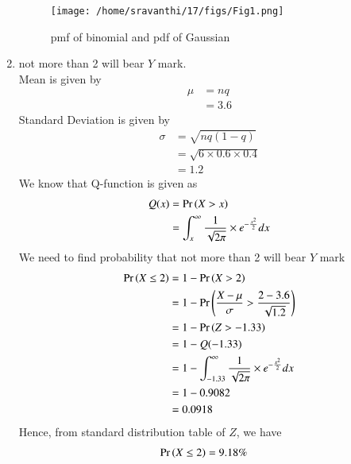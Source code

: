 \documentclass[journal,12pt,twocolumn]{IEEEtran}
\theoremstyle{remark}
\begin{document}
\begin{enumerate}
\begin{figure}
\texttt{[image: /home/sravanthi/17/figs/Fig1.png]}
\caption{pmf of binomial and pdf of Gaussian }
\label{fig:gaussian/9/3/17/}
\end{figure}
\item not more than 2 will bear $Y$ mark.\\
Mean is given by
\begin{align}
	\mu &= nq \\
	&= 3.6
\end{align}
Standard Deviation is given by
\begin{align}
	\sigma &= \sqrt{nq(1 - q)}\\
	&= \sqrt{6 \times 0.6 \times 0.4}\\
	&=  1.2
\end{align}
We know that Q-function is given as\\
\begin{align}
Q(x) &= \Pr\left(X > x\right)\\
&= \int_{x}^{\infty}\frac{1}{\sqrt{2\pi}}\times e^{-\frac{x^2}{2}}dx
\end{align}
We need to find probability that not more than 2 will bear $Y$ mark
\begin{align}
\Pr\left(X \leq 2\right) &= 1 - \Pr\left(X > 2\right)\\
&= 1 - \Pr\left(\frac{X - \mu}{\sigma} > \frac{2 - 3.6}{\sqrt{1.2}}\right) \\
&= 1 - \Pr\left(Z > -1.33\right) \\
&= 1 - Q(-1.33)\\
&= 1 - \int_{-1.33}^{\infty}\frac{1}{\sqrt{2\pi}}\times e^{-\frac{x^2}{2}}dx\\
&= 1- 0.9082\\
&=0.0918
\end{align}
Hence, from standard distribution table of $Z$, we have
\begin{align}
	\Pr\left(X \leq 2\right) &=9.18\%
\end{align}


\end{enumerate}
\end{document}
